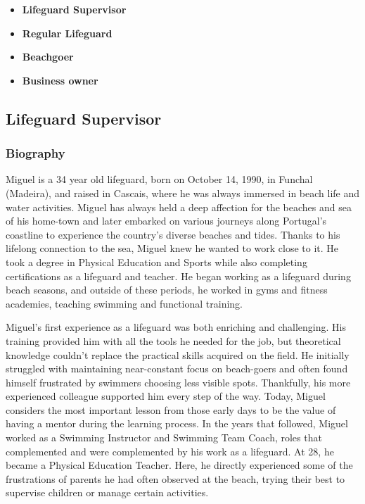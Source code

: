 \begin{itemize}
    \item \textbf{Lifeguard Supervisor}
    \item \textbf{Regular Lifeguard}
    \item \textbf{Beachgoer}
    \item \textbf{Business owner}
\end{itemize}

\subsection{Lifeguard Supervisor}
\subsubsection{\textbf{Biography}}
Miguel is a 34 year old lifeguard, born on October 14, 1990, in Funchal (Madeira), and raised in Cascais, where he was always immersed in beach life and water activities. Miguel has always held a deep affection for the beaches and sea of his home-town and later embarked on various journeys along Portugal’s coastline to experience the country's diverse beaches and tides. Thanks to his lifelong connection to the sea, Miguel knew he wanted to work close to it. He took a degree in Physical Education and Sports while also completing certifications as a lifeguard and teacher. He began working as a lifeguard during beach seasons, and outside of these periods, he worked in gyms and fitness academies, teaching swimming and functional training.

Miguel’s first experience as a lifeguard was both enriching and challenging. His training provided him with all the tools he needed for the job, but theoretical knowledge couldn’t replace the practical skills acquired on the field. He initially struggled with maintaining near-constant focus on beach-goers and often found himself frustrated by swimmers choosing less visible spots. Thankfully, his more experienced colleague supported him every step of the way. Today, Miguel considers the most important lesson from those early days to be the value of having a mentor during the learning process. In the years that followed, Miguel worked as a Swimming Instructor and Swimming Team Coach, roles that complemented and were complemented by his work as a lifeguard. At 28, he became a Physical Education Teacher. Here, he directly experienced some of the frustrations of parents he had often observed at the beach, trying their best to supervise children or manage certain activities.

